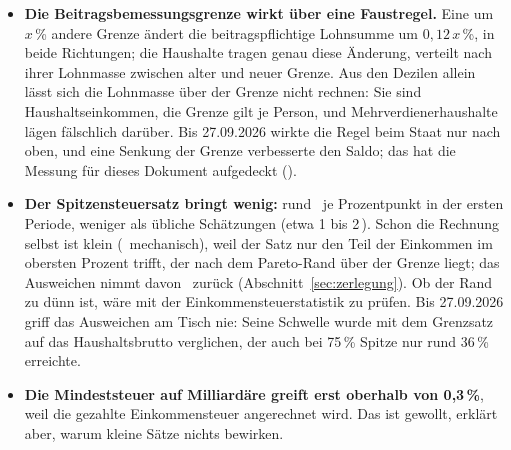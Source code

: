 \begin{itemize}
\item \textbf{Die Beitragsbemessungsgrenze wirkt über eine Faustregel.} Eine um $x$\,\% andere
  Grenze ändert die beitragspflichtige Lohnsumme um $0{,}12\,x$\,\%, in beide Richtungen; die
  Haushalte tragen genau diese Änderung, verteilt nach ihrer Lohnmasse zwischen alter und neuer
  Grenze. Aus den Dezilen allein lässt sich die Lohnmasse über der Grenze nicht rechnen: Sie
  sind Haushaltseinkommen, die Grenze gilt je Person, und Mehrverdienerhaushalte lägen
  fälschlich darüber. Bis 27.09.2026 wirkte die Regel beim Staat nur nach oben, und eine
  Senkung der Grenze verbesserte den Saldo; das hat die Messung für dieses Dokument
  aufgedeckt ().
\item \textbf{Der Spitzensteuersatz bringt wenig:} rund \,\Mrd{} je
  Prozentpunkt in der ersten Periode, weniger als übliche Schätzungen (etwa 1 bis 2\,\Mrd).
  Schon die Rechnung selbst ist klein (\,\Mrd{} mechanisch),
  weil der Satz nur den Teil der Einkommen im obersten Prozent trifft, der nach dem
  Pareto-Rand über der Grenze liegt; das Ausweichen nimmt davon
  \,\Mrd{} zurück (Abschnitt~\ref{sec:zerlegung}). Ob der Rand zu
  dünn ist, wäre mit der Einkommensteuerstatistik zu prüfen. Bis 27.09.2026 griff das
  Ausweichen am Tisch nie: Seine Schwelle wurde mit dem Grenzsatz auf das Haushaltsbrutto
  verglichen, der auch bei 75\,\% Spitze nur rund 36\,\% erreichte.
\item \textbf{Die Mindeststeuer auf Milliardäre greift erst oberhalb von 0,3\,\%}, weil die
  gezahlte Einkommensteuer angerechnet wird. Das ist gewollt, erklärt aber, warum kleine
  Sätze nichts bewirken.
\end{itemize}
